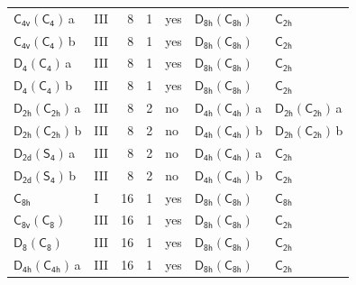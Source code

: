 \documentclass[10pt,a4paper]{article}
\numberwithin{equation}{section}
\newcommand{\grp}[1]{\mathsf{#1}}
\newcommand{\clsletter}[1]{\,{\scriptsize\color{black!55}#1}}
\begin{document}
{\begin{longtable}{@{}llrrlll@{}}
\href{C4v-C4.pdf}{$\grp{C_{4v}}(\grp{C_{4}})$}\clsletter{a} & III & 8 & 1 & yes & \href{D8h-C8h.pdf}{$\grp{D_{8h}}(\grp{C_{8h}})$} & \href{../../../rotation/data/pdf/C2h.pdf}{$\grp{C_{2h}}$}\\
\href{C4v-C4.pdf}{$\grp{C_{4v}}(\grp{C_{4}})$}\clsletter{b} & III & 8 & 1 & yes & \href{D8h-C8h.pdf}{$\grp{D_{8h}}(\grp{C_{8h}})$} & \href{../../../rotation/data/pdf/C2h.pdf}{$\grp{C_{2h}}$}\\
\href{D4-C4.pdf}{$\grp{D_{4}}(\grp{C_{4}})$}\clsletter{a} & III & 8 & 1 & yes & \href{D8h-C8h.pdf}{$\grp{D_{8h}}(\grp{C_{8h}})$} & \href{../../../rotation/data/pdf/C2h.pdf}{$\grp{C_{2h}}$}\\
\href{D4-C4.pdf}{$\grp{D_{4}}(\grp{C_{4}})$}\clsletter{b} & III & 8 & 1 & yes & \href{D8h-C8h.pdf}{$\grp{D_{8h}}(\grp{C_{8h}})$} & \href{../../../rotation/data/pdf/C2h.pdf}{$\grp{C_{2h}}$}\\
\href{D2h-C2h.pdf}{$\grp{D_{2h}}(\grp{C_{2h}})$}\clsletter{a} & III & 8 & 2 & no & \href{D4h-C4h.pdf}{$\grp{D_{4h}}(\grp{C_{4h}})$}\clsletter{a} & \href{D2h-C2h.pdf}{$\grp{D_{2h}}(\grp{C_{2h}})$}\clsletter{a}\\
\href{D2h-C2h.pdf}{$\grp{D_{2h}}(\grp{C_{2h}})$}\clsletter{b} & III & 8 & 2 & no & \href{D4h-C4h.pdf}{$\grp{D_{4h}}(\grp{C_{4h}})$}\clsletter{b} & \href{D2h-C2h.pdf}{$\grp{D_{2h}}(\grp{C_{2h}})$}\clsletter{b}\\
\href{D2d-S4.pdf}{$\grp{D_{2d}}(\grp{S_{4}})$}\clsletter{a} & III & 8 & 2 & no & \href{D4h-C4h.pdf}{$\grp{D_{4h}}(\grp{C_{4h}})$}\clsletter{a} & \href{../../../rotation/data/pdf/C2h.pdf}{$\grp{C_{2h}}$}\\
\href{D2d-S4.pdf}{$\grp{D_{2d}}(\grp{S_{4}})$}\clsletter{b} & III & 8 & 2 & no & \href{D4h-C4h.pdf}{$\grp{D_{4h}}(\grp{C_{4h}})$}\clsletter{b} & \href{../../../rotation/data/pdf/C2h.pdf}{$\grp{C_{2h}}$}\\
\href{../../../rotation/data/pdf/C8h.pdf}{$\grp{C_{8h}}$} & I & 16 & 1 & yes & \href{D8h-C8h.pdf}{$\grp{D_{8h}}(\grp{C_{8h}})$} & \href{../../../rotation/data/pdf/C8h.pdf}{$\grp{C_{8h}}$}\\
\href{C8v-C8.pdf}{$\grp{C_{8v}}(\grp{C_{8}})$} & III & 16 & 1 & yes & \href{D8h-C8h.pdf}{$\grp{D_{8h}}(\grp{C_{8h}})$} & \href{../../../rotation/data/pdf/C2h.pdf}{$\grp{C_{2h}}$}\\
\href{D8-C8.pdf}{$\grp{D_{8}}(\grp{C_{8}})$} & III & 16 & 1 & yes & \href{D8h-C8h.pdf}{$\grp{D_{8h}}(\grp{C_{8h}})$} & \href{../../../rotation/data/pdf/C2h.pdf}{$\grp{C_{2h}}$}\\
\href{D4h-C4h.pdf}{$\grp{D_{4h}}(\grp{C_{4h}})$}\clsletter{a} & III & 16 & 1 & yes & \href{D8h-C8h.pdf}{$\grp{D_{8h}}(\grp{C_{8h}})$} & \href{../../../rotation/data/pdf/C2h.pdf}{$\grp{C_{2h}}$}\\

\end{longtable}}
\end{document}
